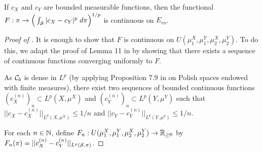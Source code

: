 \begin{lemma} \label{lemma:coot_continuous}
    If $c_X$ and $c_Y$ are bounded measurable functions, then
    the functional $F: \pi \to \Big( \int_{\mathcal S} \vert c_X - c_Y \vert^p \; d\pi \Big)^{1/p}$ is continuous on $E_{co}$.
\end{lemma}
\begin{proof}[Proof of ]
  It is enough to show that $F$ is continuous on $U(\mu_1^X, \mu_1^Y, \mu_2^X, \mu_2^Y)$.
  To do this, we adapt the proof of Lemma 11 in \citep{Chowdhury19} by showing that
  there exists a sequence of continuous functions converging uniformly to $F$.

  As $\mathcal C_b$ is dense in $L^p$ (by applying Proposition 7.9 in \citep{Folland99}
  on Polish spaces endowed with finite measures), there exist two sequences of
  bounded continuous functions $(c_X^{(n)})_n \subset L^p(X, \mu^X)$ and
  $(c_Y^{(n)})_n \subset L^p(Y, \mu^Y)$ such that
  $\vert\vert c_X - c_X^{(n)} \vert\vert_{L^p(X, \mu^X)} \leq 1/n$ and
  $\vert\vert c_Y - c_Y^{(n)} \vert\vert_{L^p(Y, \mu^Y)} \leq 1/n$.

  For each $n \in \mathbb N$, define $F_n: U(\mu_1^X, \mu_1^Y, \mu_2^X, \mu_2^Y) \to \mathbb R_{\geq 0}$
  by $F_n(\pi) = \vert\vert c_X^{(n)} - c_Y^{(n)} \vert\vert_{L^p(\mathcal S, \pi)}$.


\end{proof}
